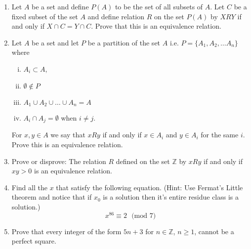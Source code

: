 \documentclass[12pt,letterpaper]{article}
\theoremstyle{plain}
\theoremstyle{definition}
\begin{document}
\begin{enumerate}[1.]
\item Let $A$ be a set and define $P(A)$ to be the set of all subsets of $A$. Let $C$ be a fixed subset of the set $A$ and define relation $R$ on the set $P(A)$ by $X R Y$ if and only if $X\cap C=Y\cap C$. Prove that this is an equivalence relation. 
\ \\
\item Let $A$ be a set and let $P$ be a partition of the set $A$ i.e. $P=\{A_1, A_2, \ldots A_n\}$ where 
\begin{enumerate}[i)]
\item $A_i\subset A$, 
\item $\emptyset \not \in P$
\item $A_1\cup A_2\cup \ldots \cup A_n=A$ 
\item $A_i\cap A_j =\emptyset $ when $i\neq j$. 
\end{enumerate}
For $x,y \in A$ we say that $x R y$ if and only if $x\in A_i$ and $y\in A_i$ for the same $i$. Prove this is an equivalence relation. 
\item Prove or disprove: The relation $R$ defined on the set $\mathbb{Z}$ by $x R y$ if and only if $xy>0$ is an equivalence relation. 
\item Find all the $x$ that satisfy the following equation. (Hint: Use Fermat's Little theorem and notice that if $x_0$ is a solution then it's entire residue class is a solution.) 
\[x^{86} \equiv 2\ \ \  \text{(mod 7)}\]
\item Prove that every integer of the form $5n+3$ for $n\in \mathbb{Z}$, $n\geq 1$, cannot be a perfect square.  
\end{enumerate}
\end{document}
